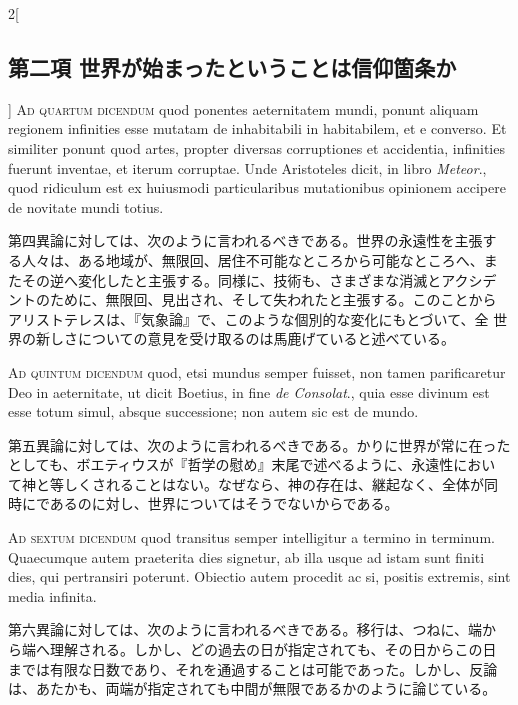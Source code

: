 \documentclass[paper=a4paper,fontsize=10pt,jafontsize=9pt,titlepage]{jlreq}
\begin{document}
\begin{paracol}{2}[\subsection{第二項 世界が始まったということは信仰箇条か}]
{\scshape Ad quartum dicendum} quod ponentes aeternitatem mundi, ponunt
 aliquam regionem infinities esse mutatam de inhabitabili in
 habitabilem, et e converso. Et similiter ponunt quod artes, propter
 diversas corruptiones et accidentia, infinities fuerunt inventae, et
 iterum corruptae. Unde Aristoteles dicit, in libro {\itshape Meteor}., quod
 ridiculum est ex huiusmodi particularibus mutationibus opinionem
 accipere de novitate mundi totius.


\switchcolumn


第四異論に対しては、次のように言われるべきである。世界の永遠性を主張す
る人々は、ある地域が、無限回、居住不可能なところから可能なところへ、ま
たその逆へ変化したと主張する。同様に、技術も、さまざまな消滅とアクシデ
ントのために、無限回、見出され、そして失われたと主張する。このことから
アリストテレスは、『気象論』で、このような個別的な変化にもとづいて、全
世界の新しさについての意見を受け取るのは馬鹿げていると述べている。


\switchcolumn*[\subsection{ad.5}]


{\scshape Ad quintum dicendum} quod, etsi mundus semper fuisset, non tamen
 parificaretur Deo in aeternitate, ut dicit Boetius, in fine {\itshape de
 Consolat}., quia esse divinum est esse totum simul, absque successione;
 non autem sic est de mundo.


\switchcolumn


第五異論に対しては、次のように言われるべきである。かりに世界が常に在った
としても、ボエティウスが『哲学の慰め』末尾で述べるように、永遠性におい
て神と等しくされることはない。なぜなら、神の存在は、継起なく、全体が同
時にであるのに対し、世界についてはそうでないからである。


\switchcolumn*[\subsection{ad.6}]


{\scshape Ad sextum dicendum} quod transitus semper intelligitur a termino in
 terminum. Quaecumque autem praeterita dies signetur, ab illa usque ad
 istam sunt finiti dies, qui pertransiri poterunt. Obiectio autem
 procedit ac si, positis extremis, sint media infinita.


\switchcolumn


第六異論に対しては、次のように言われるべきである。移行は、つねに、端か
ら端へ理解される。しかし、どの過去の日が指定されても、その日からこの日
までは有限な日数であり、それを通過することは可能であった。しかし、反論
は、あたかも、両端が指定されても中間が無限であるかのように論じている。



\end{paracol}
\end{document}
